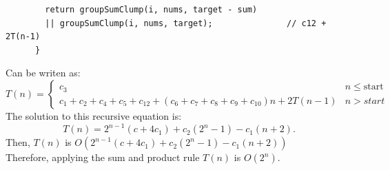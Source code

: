 \documentclass[a4paper,12pt]{article}
\begin{document}
\begin{enumerate}
\begin{Verbatim}
        return groupSumClump(i, nums, target - sum)
        || groupSumClump(i, nums, target);               // c12 + 2T(n-1)
      }
      \end{Verbatim}
      Can be writen as:
      \begin{equation*}
        T\left(n\right)=\left\{\begin{array}{cc}c_{3}&n\leq \text{start}\\c_{1}+c_{2}+c_{4}+c_{5}+c_{12}+\left(c_{6}+c_{7}+c_{8}+c_{9}+c_{10}\right)n+2T\left(n-1\right) & n>start\end{array}\right.
      \end{equation*}
      The solution to this recursive equation is:
      \begin{equation*}
        T\left( n \right) = 2^{n-1} \left( c + 4 c_1 \right) + c_2 \left( 2^{n} - 1 \right) - c_1 \left( n +2 \right).
      \end{equation*}
      Then, $T\left(n\right)$ is $O\left(2^{n-1} \left( c + 4 c_1 \right) + c_2 \left( 2^{n} - 1 \right) - c_1 \left( n +2 \right)\right)$\\
      Therefore, applying the sum and product rule $T(n)$ is $O(2^n)$.


\end{enumerate}
\end{document}
